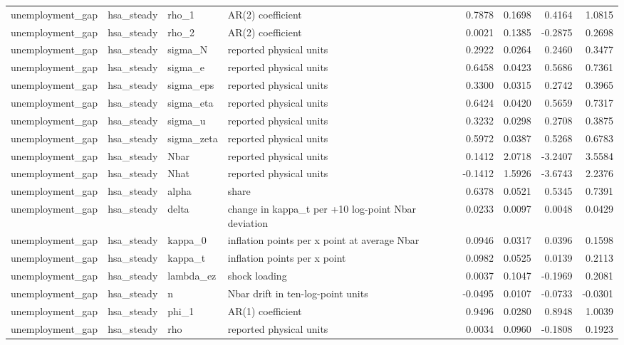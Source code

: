 \begin{tabular}{llllrrrr}
unemployment\_gap & hsa\_steady & rho\_1 & AR(2) coefficient & 0.7878 & 0.1698 & 0.4164 & 1.0815 \\
unemployment\_gap & hsa\_steady & rho\_2 & AR(2) coefficient & 0.0021 & 0.1385 & -0.2875 & 0.2698 \\
unemployment\_gap & hsa\_steady & sigma\_N & reported physical units & 0.2922 & 0.0264 & 0.2460 & 0.3477 \\
unemployment\_gap & hsa\_steady & sigma\_e & reported physical units & 0.6458 & 0.0423 & 0.5686 & 0.7361 \\
unemployment\_gap & hsa\_steady & sigma\_eps & reported physical units & 0.3300 & 0.0315 & 0.2742 & 0.3965 \\
unemployment\_gap & hsa\_steady & sigma\_eta & reported physical units & 0.6424 & 0.0420 & 0.5659 & 0.7317 \\
unemployment\_gap & hsa\_steady & sigma\_u & reported physical units & 0.3232 & 0.0298 & 0.2708 & 0.3875 \\
unemployment\_gap & hsa\_steady & sigma\_zeta & reported physical units & 0.5972 & 0.0387 & 0.5268 & 0.6783 \\
unemployment\_gap & hsa\_steady & Nbar & reported physical units & 0.1412 & 2.0718 & -3.2407 & 3.5584 \\
unemployment\_gap & hsa\_steady & Nhat & reported physical units & -0.1412 & 1.5926 & -3.6743 & 2.2376 \\
unemployment\_gap & hsa\_steady & alpha & share & 0.6378 & 0.0521 & 0.5345 & 0.7391 \\
unemployment\_gap & hsa\_steady & delta & change in kappa\_t per +10 log-point Nbar deviation & 0.0233 & 0.0097 & 0.0048 & 0.0429 \\
unemployment\_gap & hsa\_steady & kappa\_0 & inflation points per x point at average Nbar & 0.0946 & 0.0317 & 0.0396 & 0.1598 \\
unemployment\_gap & hsa\_steady & kappa\_t & inflation points per x point & 0.0982 & 0.0525 & 0.0139 & 0.2113 \\
unemployment\_gap & hsa\_steady & lambda\_ez & shock loading & 0.0037 & 0.1047 & -0.1969 & 0.2081 \\
unemployment\_gap & hsa\_steady & n & Nbar drift in ten-log-point units & -0.0495 & 0.0107 & -0.0733 & -0.0301 \\
unemployment\_gap & hsa\_steady & phi\_1 & AR(1) coefficient & 0.9496 & 0.0280 & 0.8948 & 1.0039 \\
unemployment\_gap & hsa\_steady & rho & reported physical units & 0.0034 & 0.0960 & -0.1808 & 0.1923 \\

\end{tabular}
